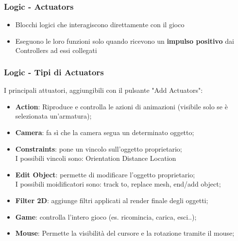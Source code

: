 \documentclass{beamer}
\begin{document}
		
		\begin{frame}
			\frametitle{Logic - Actuators} %
			\begin{itemize}
				\item Blocchi logici che interagiscono direttamente con il gioco
				\item Eseguono le loro funzioni solo quando ricevono un \textbf{impulso positivo} dai Controllers ad essi collegati
			\end{itemize}
		\end{frame}			
		\begin{frame}
			\frametitle{Logic - Tipi di Actuators}
			I principali attuatori, aggiungibili con il pulsante "Add Actuators":
			\begin{itemize}
				\item \textbf{Action}: {\footnotesize Riproduce e controlla le azioni di animazioni (visibile solo se è selezionata un'armatura);} %
				\item \textbf{Camera}: {\footnotesize fa sì che la camera segua un determinato oggetto;}
				\item \textbf{Constraints}: {\footnotesize  pone un vincolo sull’oggetto proprietario; \\I possibili vincoli sono: Orientation Distance Location}
				\item \textbf{Edit Object}: {\footnotesize permette di modificare l'oggetto proprietario; \\I possibili moidificatori sono: track to, replace mesh, end/add object;}
				\item \textbf{Filter 2D}: {\footnotesize aggiunge filtri applicati al render finale degli oggetti;}
				\item \textbf{Game}: {\footnotesize controlla l'intero gioco (es. ricomincia, carica, esci..);}
				\item \textbf{Mouse}: {\footnotesize Permette la visibilità del cursore e la rotazione tramite il mouse;}
			\end{itemize}
		\end{frame}
\end{document}
